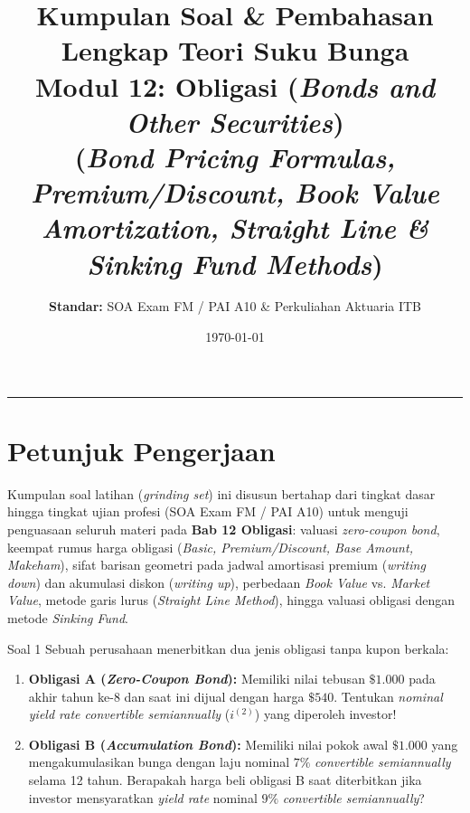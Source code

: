 \documentclass[11pt,a4paper]{article}
\title{\textbf{\LARGE Kumpulan Soal \& Pembahasan Lengkap Teori Suku Bunga}\\[0.3em]
\Large Modul 12: Obligasi (\textit{Bonds and Other Securities})\\
\large (\textit{Bond Pricing Formulas, Premium/Discount, Book Value Amortization, Straight Line \& Sinking Fund Methods})}
\author{\textbf{Standar:} SOA Exam FM / PAI A10 \& Perkuliahan Aktuaria ITB}
\date{\today}
\begin{document}
\maketitle
\noindent\rule{\textwidth}{0.4pt}
\vspace{0.8em}

\section*{Petunjuk Pengerjaan}
Kumpulan soal latihan (\textit{grinding set}) ini disusun bertahap dari tingkat dasar hingga tingkat ujian profesi (SOA Exam FM / PAI A10) untuk menguji penguasaan seluruh materi pada \textbf{Bab 12 Obligasi}: valuasi \textit{zero-coupon bond}, keempat rumus harga obligasi (\textit{Basic, Premium/Discount, Base Amount, Makeham}), sifat barisan geometri pada jadwal amortisasi premium (\textit{writing down}) dan akumulasi diskon (\textit{writing up}), perbedaan \textit{Book Value} vs. \textit{Market Value}, metode garis lurus (\textit{Straight Line Method}), hingga valuasi obligasi dengan metode \textit{Sinking Fund}.

\vspace{1em}

\begin{problembox}{Soal 1}
Sebuah perusahaan menerbitkan dua jenis obligasi tanpa kupon berkala:
\begin{enumerate}[label=(\alph*)]
    \item \textbf{Obligasi A (\textit{Zero-Coupon Bond}):} Memiliki nilai tebusan $\$1.000$ pada akhir tahun ke-8 dan saat ini dijual dengan harga $\$540$. Tentukan \textit{nominal yield rate convertible semiannually} ($i^{(2)}$) yang diperoleh investor!
    \item \textbf{Obligasi B (\textit{Accumulation Bond}):} Memiliki nilai pokok awal $\$1.000$ yang mengakumulasikan bunga dengan laju nominal $7\%$ \textit{convertible semiannually} selama 12 tahun. Berapakah harga beli obligasi B saat diterbitkan jika investor mensyaratkan \textit{yield rate} nominal $9\%$ \textit{convertible semiannually}?
\end{enumerate}
\end{problembox}
\end{document}
